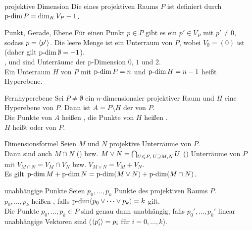 \begin{Def}{projektive Dimension}
    Die  eines projektiven Raums $P$ ist
    definiert durch $\operatorname{p-dim} P = \dim_K V_P - 1$.
\end{Def}

\begin{Def}{Punkt, Gerade, Ebene}
    Für einen Punkt $p \in P$ gibt es ein $p' \in V_P$ mit $p' \not= 0$, sodass
    $p = \langle p' \rangle$.
    Die leere Menge ist ein Unterraum von $P$, wobei $V_\emptyset = (0)$ ist
    (daher gilt $\operatorname{p-dim} \emptyset = -1$). \\
    ,  und  sind Unterräume
    der p-Dimension $0$, $1$ und $2$. \\
    Ein Unterraum $H$ von $P$ mit $\operatorname{p-dim} P = n$ und $\operatorname{p-dim} H = n - 1$ heißt
    Hyperebene.
\end{Def}

\begin{Def}{Fernhyperebene}
    Sei $P \not= \emptyset$ ein $n$-dimensionaler
    projektiver Raum und $H$ eine Hyperebene von $P$.
    Dann ist $A = P \setminus H$ der
     von $P$. \\
    Die Punkte von $A$ heißen ,
    die Punkte von $H$ heißen . \\
    $H$ heißt  oder
     von $P$.
\end{Def}

\begin{Satz}{Dimensionsformel}
    Seien $M$ und $N$ projektive Unterräume von $P$. \\
    Dann sind auch $M \cap N$ () bzw.
    $M \lor N = \bigcap_{U \leqslant P,\; U \supseteq M,N} U$
    () Unterräume von $P$ mit
    $V_{M \cap N} = V_M \cap V_N$ bzw. $V_{M \lor N} = V_M + V_N$. \\
    Es gilt $\operatorname{p-dim} M + \operatorname{p-dim} N = \operatorname{p-dim}(M \lor N) + \operatorname{p-dim}(M \cap N)$.
\end{Satz}

\begin{Def}{unabhängige Punkte}
    Seien $p_0, \ldots, p_k$ Punkte des projektiven Raums $P$. \\
    $p_0, \ldots, p_k$ heißen , falls
    $\operatorname{p-dim}(p_0 \lor \cdots \lor p_k) = k$ gilt. \\
    Die Punkte $p_0, \ldots, p_k \in P$ sind genau dann unabhängig, falls
    $p_0', \ldots, p_k'$ linear unabhängige Vektoren sind
    ($\langle p_i' \rangle = p_i$ für $i = 0, \ldots, k$).
\end{Def}

